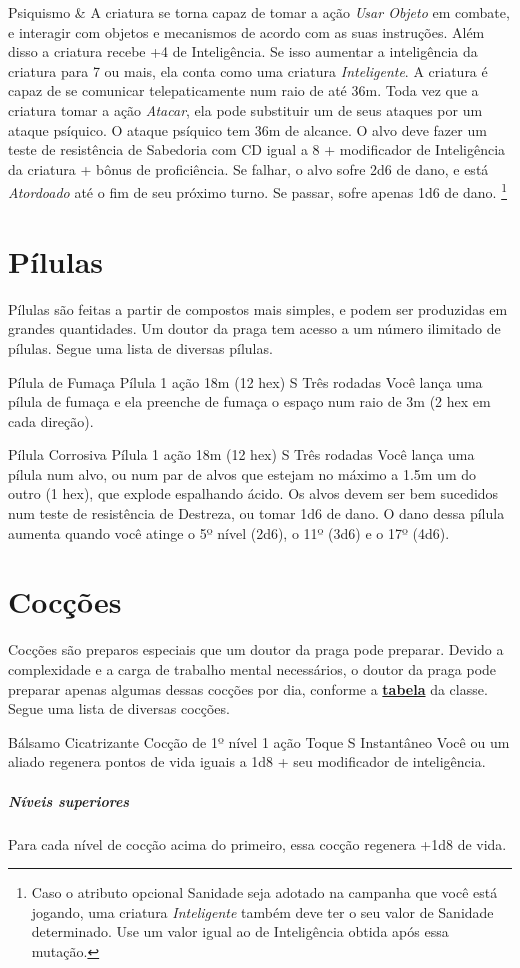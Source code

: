 \documentclass[letterpaper,twocolumn,openany]{dndbook}
\begin{document}
{\begin{dndtable}
			Psiquismo & A criatura se torna capaz de tomar a ação \textit{Usar Objeto} em combate, e interagir com objetos e mecanismos de acordo com as suas instruções. Além disso a criatura recebe +4 de Inteligência. Se isso aumentar a inteligência da criatura para 7 ou mais, ela conta como uma criatura \textit{Inteligente}. A criatura é capaz de se comunicar telepaticamente num raio de até 36m. Toda vez que a criatura tomar a ação \textit{Atacar}, ela pode substituir um de seus ataques por um ataque psíquico. O ataque psíquico tem 36m de alcance. O alvo deve fazer um teste de resistência de Sabedoria com CD igual a 8 + modificador de Inteligência da criatura + bônus de proficiência. Se falhar, o alvo sofre 2d6 de dano, e está \textit{Atordoado} até o fim de seu próximo turno. Se passar, sofre apenas 1d6 de dano. \footnote{Caso o atributo opcional Sanidade seja adotado na campanha que você está jogando, uma criatura \textit{Inteligente} também deve ter o seu valor de Sanidade determinado. Use um valor igual ao de Inteligência obtida após essa mutação.} \\
		\end{dndtable}
	}
	\twocolumn
		
	\section{Pílulas}
	\label{sec:pilulas}
	Pílulas são feitas a partir de compostos mais simples, e podem ser produzidas em grandes quantidades. Um doutor da praga tem acesso a um número ilimitado de pílulas. Segue uma lista de diversas pílulas.
	
	\spellheader%
	{Pílula de Fumaça}
	{Pílula}
	{1 ação}
	{18m (12 hex)}
	{S}
	{Três rodadas}
	Você lança uma pílula de fumaça e ela preenche de fumaça o espaço num raio de 3m (2 hex em cada direção).
	
	\spellheader%
	{Pílula Corrosiva}
	{Pílula}
	{1 ação}
	{18m (12 hex)}
	{S}
	{Três rodadas}
	Você lança uma pílula num alvo, ou num par de alvos que estejam no máximo a 1.5m um do outro (1 hex), que explode espalhando ácido. Os alvos devem ser bem sucedidos num teste de resistência de Destreza, ou tomar 1d6 de dano. O dano dessa pílula aumenta quando você atinge o 5º nível (2d6), o 11º (3d6) e o 17º (4d6).
	
	\section{Cocções}
	Cocções são preparos especiais que um doutor da praga pode preparar. Devido a complexidade e a carga de trabalho mental necessários, o doutor da praga pode preparar apenas algumas dessas cocções por dia, conforme a \hyperref[tab:doutor_da_praga]{\textbf{tabela}} da classe.
	Segue uma lista de diversas cocções.
	
	\spellheader%
	{Bálsamo Cicatrizante}
	{Cocção de 1º nível}
	{1 ação}
	{Toque}
	{S}
	{Instantâneo}
	Você ou um aliado regenera pontos de vida iguais a 1d8 + seu modificador de inteligência.
	\subparagraph{Níveis superiores} Para cada nível de cocção acima do primeiro, essa cocção regenera +1d8 de vida.
	
\end{document}
